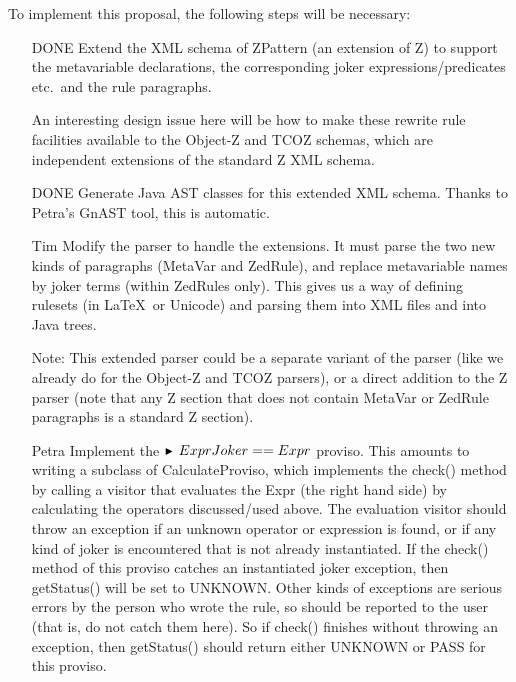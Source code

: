 \documentclass{article}
\newcommand{\proviso}{\raisebox{0.5ex}{${}_{\blacktriangleright}\ $}}%
\begin{document}
To implement this proposal, the following steps will be necessary:
\begin{enumerate}
\item [DONE] Extend the XML schema of ZPattern (an extension of Z)
  to support the metavariable declarations, the corresponding joker
  expressions/predicates etc.~and the rule paragraphs.

  An interesting design issue here
  will be how to make these rewrite rule facilities available
  to the Object-Z and TCOZ schemas, which are independent extensions
  of the standard Z XML schema.

\item [DONE] Generate Java AST classes for this extended XML schema.
  Thanks to Petra's GnAST tool, this is automatic.

\item [Tim] Modify the parser to handle the extensions.
  It must parse the two new kinds of paragraphs (MetaVar and ZedRule), and
  replace metavariable names by joker terms (within ZedRules only).
  This gives us a way of defining rulesets (in \LaTeX\ or Unicode)
  and parsing them into XML files and into Java trees.

  Note: This extended parser could be a separate variant of the
  parser (like we already do for the Object-Z and TCOZ parsers),
  or a direct addition to the Z parser (note that any Z section 
  that does not contain MetaVar or ZedRule paragraphs is a standard
  Z section).

\item [Petra] Implement the $\proviso ExprJoker == Expr$ proviso.
  This amounts to writing a subclass of CalculateProviso, which
  implements the check() method by calling a visitor that evaluates the 
  Expr (the right hand side) by calculating the operators discussed/used
  above.
  The evaluation visitor should throw an exception if an unknown operator or
  expression is found, or if any kind of joker is encountered
  that is not already instantiated.  If the check() method of this proviso
  catches an instantiated joker exception, then getStatus() will be set to
  UNKNOWN.  Other kinds of exceptions are serious errors by the person who
  wrote the rule, so should be reported to the user (that is, do not
  catch them here).  So if check() finishes without throwing an exception,
  then getStatus() should return either UNKNOWN or PASS for this proviso.
  


\end{enumerate}
\end{document}
